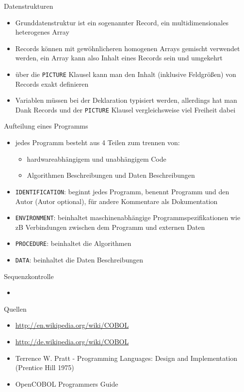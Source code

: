 \documentclass[handout]{beamer}
\begin{document}
\begin{frame}{Datenstrukturen}
	\begin{itemize}
		\item
			Grunddatenstruktur ist ein sogenannter Record, ein multidimensionales heterogenes Array
		\item
			Records k\"onnen mit gew\"ohnlicheren homogenen Arrays gemischt verwendet werden, ein Array kann also Inhalt eines Records sein und umgekehrt
		\item
			über die \texttt{PICTURE} Klausel kann man den Inhalt (inklusive Feldgrößen) von Records exakt definieren
		\item
			Variablen müssen bei der Deklaration typisiert werden, allerdings hat man Dank Records und der \texttt{PICTURE} Klausel vergleichsweise viel Freiheit dabei
	\end{itemize}
\end{frame}

\begin{frame}{Aufteilung eines Programms}
	\begin{itemize}
		\item
			jedes Programm besteht aus 4 Teilen zum trennen von:
			\begin{itemize}
			 \item hardwareabh\"angigem und unabh\"angigem Code
			 \item Algorithmen Beschreibungen und Daten Beschreibungen
			 \end{itemize}
		\item
			\texttt{IDENTIFICATION}: beginnt jedes Programm, benennt Programm und den Autor (Autor optional), für andere Kommentare als Dokumentation
		\item
			\texttt{ENVIRONMENT}: beinhaltet maschinenabhängige Programmspezifikationen wie zB Verbindungen zwischen dem Programm und externen Daten
		\item
			\texttt{PROCEDURE}: beinhaltet die Algorithmen
		\item
			\texttt{DATA}: beinhaltet die Daten Beschreibungen
	\end{itemize}
\end{frame}

\begin{frame}{Sequenzkontrolle}
	\begin{itemize}
		\item
			
	\end{itemize}
\end{frame}

\begin{frame}{Quellen}
	\begin{itemize}
		\item
			\url{http://en.wikipedia.org/wiki/COBOL}
		\item
			\url{http://de.wikipedia.org/wiki/COBOL}
		\item
			Terrence W. Pratt - Programming Languages: Design and Implementation (Prentice Hill 1975)
		\item OpenCOBOL Programmers Guide
	\end{itemize}
\end{frame}
\end{document}
